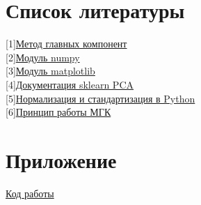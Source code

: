 \documentclass[a4]{article}
\begin{document}
		\newpage
	\section{Список литературы}
	[1]\href{https://ru.wikipedia.org/wiki/%D0%9C%D0%B5%D1%82%D0%BE%D0%B4_%D0%B3%D0%BB%D0%B0%D0%B2%D0%BD%D1%8B%D1%85_%D0%BA%D0%BE%D0%BC%D0%BF%D0%BE%D0%BD%D0%B5%D0%BD%D1%82#:~:text=%D0%9C%D0%B5%D1%82%D0%BE%D0%B4%20%D0%B3%D0%BB%D0%B0%D0%B2%D0%BD%D1%8B%D1%85%20%D0%BA%D0%BE%D0%BC%D0%BF%D0%BE%D0%BD%D0%B5%D0%BD%D1%82%20(%D0%B0%D0%BD%D0%B3%D0%BB.,%D0%B4%D0%B0%D0%BD%D0%BD%D1%8B%D1%85%2C%20%D0%BF%D0%BE%D1%82%D0%B5%D1%80%D1%8F%D0%B2%20%D0%BD%D0%B0%D0%B8%D0%BC%D0%B5%D0%BD%D1%8C%D1%88%D0%B5%D0%B5%20%D0%BA%D0%BE%D0%BB%D0%B8%D1%87%D0%B5%D1%81%D1%82%D0%B2%D0%BE%20%D0%B8%D0%BD%D1%84%D0%BE%D1%80%D0%BC%D0%B0%D1%86%D0%B8%D0%B8.&text=%D0%9F%D1%80%D0%B8%D0%BC%D0%B5%D0%BD%D1%8F%D0%B5%D1%82%D1%81%D1%8F%20%D0%B2%D0%BE%20%D0%BC%D0%BD%D0%BE%D0%B3%D0%B8%D1%85%20%D0%BE%D0%B1%D0%BB%D0%B0%D1%81%D1%82%D1%8F%D1%85%2C%20%D0%B2,%D1%81%D0%B6%D0%B0%D1%82%D0%B8%D1%8F%20%D0%B4%D0%B0%D0%BD%D0%BD%D1%8B%D1%85%2C%20%D0%B2%20%D0%BE%D0%B1%D1%89%D0%B5%D1%81%D1%82%D0%B2%D0%B5%D0%BD%D0%BD%D1%8B%D1%85%20%D0%BD%D0%B0%D1%83%D0%BA%D0%B0%D1%85.}{Метод главных компонент} \\
	
	[2]\href{https://numpy.org/}{Модуль numpy} \\
	
	[3]\href{https://matplotlib.org/}{Модуль matplotlib} \\

	[4]\href{https://scikit-learn.org/stable/modules/generated/sklearn.decomposition.PCA.html}{Документация sklearn PCA} \\
	
	[5]\href{https://medium.com/@rrfd/standardize-or-normalize-examples-in-python-e3f174b65dfc}{Нормализация и стандартизация в Python} \\
	
	[6]\href{https://habr.com/ru/post/304214/}{Принцип работы МГК} \\
	
	\section{Приложение}
	
	\href{https://github.com/dmitry-maltsov/PolyMatStat/blob/master/Course%20project/research/PCA.ipynb}{Код работы} \\
	
\end{document}
